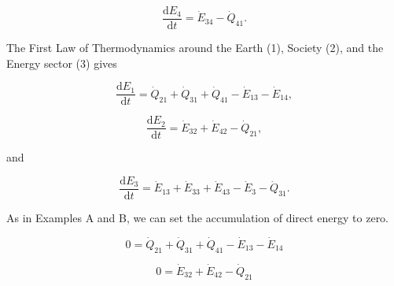 \documentclass[authoryear,preprint,review,12pt]{elsarticle}
\begin{document}
\begin{equation} \label{eq:C-CV_E_dot_4_simp}
	\frac{\mathrm{d}E_{4}}{\mathrm{d}t} 	 =  \dot{E}_{34} - \dot{Q}_{41}.
\end{equation}





The First Law of Thermodynamics around the Earth (1), Society (2), and the Energy sector (3) gives

\begin{equation} \label{eq:C-CV_E_dot_1}
	\frac{\mathrm{d}E_{1}}{\mathrm{d}t} 	 =  \dot{Q}_{21} + \dot{Q}_{31} + \dot{Q}_{41} - \dot{E}_{13} - \dot{E}_{14},
\end{equation}

\begin{equation} \label{eq:C-CV_E_dot_2}
	\frac{\mathrm{d}E_{2}}{\mathrm{d}t} 	 = \dot{E}_{32}  + \dot{E}_{42} - \dot{Q}_{21},
\end{equation}

\noindent and 

\begin{equation} \label{eq:C-CV_E_dot_3}
	\frac{\mathrm{d}E_{3}}{\mathrm{d}t} 	 = \dot{E}_{13} + \dot{E}_{33} + \dot{E}_{43} - \dot{E}_{3} - \dot{Q}_{31}.
\end{equation}

As in Examples A and B, we can set the accumulation of direct energy to zero.

\begin{equation} \label{eq:C-CV_E_dot_1_SS}
	0 =  \dot{Q}_{21} + \dot{Q}_{31} + \dot{Q}_{41} - \dot{E}_{13} - \dot{E}_{14}
\end{equation}

\begin{equation} \label{eq:C-CV_E_dot_2_SS}
	0  = \dot{E}_{32}  + \dot{E}_{42} - \dot{Q}_{21}
\end{equation}
\end{document}
